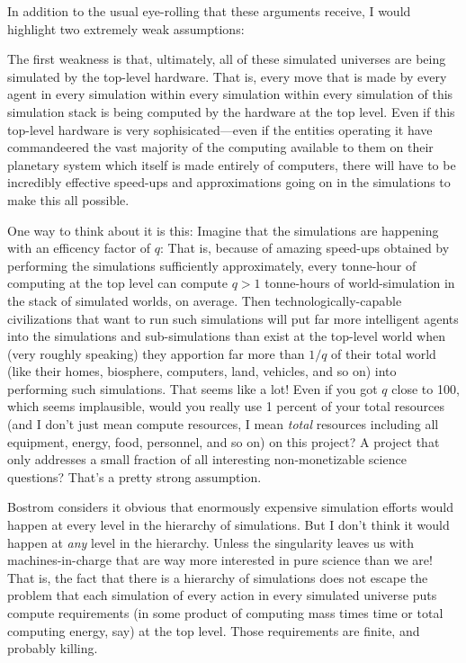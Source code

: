\documentclass[12pt,letterpaper]{article}
\begin{document}
In addition to the usual eye-rolling that these arguments receive, I
would highlight two extremely weak assumptions:

The first weakness is that, ultimately, all of these simulated
universes are being simulated by the top-level hardware. That is,
every move that is made by every agent in every simulation within
every simulation within every simulation of this simulation stack is
being computed by the hardware at the top level. Even if this
top-level hardware is very sophisicated---even if the entities
operating it have commandeered the vast majority of the computing
available to them on their planetary system which itself is made
entirely of computers, there will have to be incredibly effective
speed-ups and approximations going on in the simulations to make this
all possible.

One way to think about it is this: Imagine that the simulations are
happening with an efficency factor of $q$: That is, because of amazing
speed-ups obtained by performing the simulations sufficiently
approximately, every tonne-hour of computing at the top level can
compute $q>1$ tonne-hours of world-simulation in the stack of
simulated worlds, on average. Then technologically-capable
civilizations that want to run such simulations will put far more
intelligent agents into the simulations and sub-simulations than exist
at the top-level world when (very roughly speaking) they apportion far
more than $1/q$ of their total world (like their homes, biosphere,
computers, land, vehicles, and so on) into performing such
simulations. That seems like a lot! Even if you got $q$ close to 100,
which seems implausible, would you really use 1 percent of your total
resources (and I don't just mean compute resources, I mean
\emph{total} resources including all equipment, energy, food,
personnel, and so on) on this project? A project that only addresses a
small fraction of all interesting non-monetizable science questions?
That's a pretty strong assumption.

Bostrom considers it obvious that enormously expensive simulation
efforts would happen at every level in the hierarchy of
simulations. But I don't think it would happen at \emph{any} level in
the hierarchy. Unless the singularity leaves us with
machines-in-charge that are way more interested in pure science than
we are! That is, the fact that there is a hierarchy of simulations
does not escape the problem that each simulation of every action in
every simulated universe puts compute requirements (in some product of
computing mass times time or total computing energy, say) at the top
level. Those requirements are finite, and probably killing.
\end{document}
